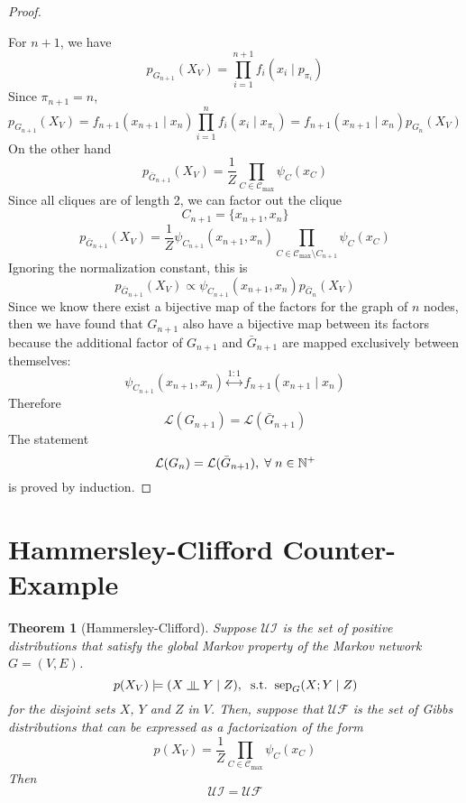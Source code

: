 \documentclass{article}
\numberwithin{equation}{section}
\newcommand{\s}{\hspace{0.1cm}}
\newcommand{\indep}{\s \rotatebox[origin=c]{90}{$\models$}\s }
\theoremstyle{named}
\newtheorem*{namedtheorem}{Theorem}
\begin{document}
\begin{proof}
\begin{enumerate}
        \end{enumerate}

        For $n + 1$, we have
        \[
                p_{G_{n + 1}}(X_V) = \prod_{i = 1}^{n+1} f_i(x_i \mid p_{\pi_i})
        \]
        Since $\pi_{n +1} = n$, 
        \[
                p_{G_{n + 1}}(X_V) = f_{n + 1}(x_{n + 1} \mid x_{n})\prod_{i = 1}^{n} 
                f_i(x_i \mid x_{\pi_i}) = f_{n + 1}(x_{n + 1} \mid x_n) p_{G_n}(X_V)
        \]
        On the other hand
        \[
                p_{\bar{G}_{n + 1}}(X_V) = \frac{1}{Z} \prod_{C \in \mathscr{C}_{\max}} 
                \psi_C (x_C)
        \]
        Since all cliques are of length 2, we can factor out the clique 
        \[
                C_{n + 1} = \{x_{n + 1}, x_n\} 
        \]
        \[
                p_{\bar{G}_{n + 1}}(X_V) = \frac{1}{Z} \psi_{C_{n + 1}}(x_{n + 1}, x_n) 
                \prod_{C \in \mathscr{C}_{\max} \setminus C_{n + 1}} \psi_C(x_C)
        \]
        Ignoring the normalization constant, this is 
        \[
                p_{\bar{G}_{n + 1}}(X_V) 
                \propto \psi_{C_{n + 1}}(x_{n + 1}, x_n) p_{\bar{G}_n}(X_V)
        \]
        Since we know there exist a bijective map of the factors for the graph of 
        $n$ nodes, then we have found that $G_{n + 1}$ also have a bijective 
        map between its factors because the additional factor of $G_{n + 1}$ 
        and $\bar{G}_{n + 1}$ are mapped exclusively between themselves:
        \[
                \psi_{C_{n + 1}}(x_{n + 1}, x_n) 
                \overset{1:1}{\longleftrightarrow} f_{n + 1}(x_{n + 1} \mid x_n)
        \]
        Therefore
        \[
                \mathcal{L}(G_{n + 1}) = \mathcal{L}(\bar{G}_{n + 1})
        \]
        The statement 
        \[
                \mathcal{L}(G_n) = \mathcal{L}(\bar{G}_{n+1}),\s \forall \s n
                \in \mathbb{N}^+
        \]
        is proved by induction.

\end{proof}



\section{Hammersley-Clifford Counter-Example}
\begin{namedtheorem}[Hammersley-Clifford]
Suppose $\mathcal{UI}$ is the set of positive distributions that satisfy the global Markov 
property of the Markov network $G = (V, E)$. 
\[
        p(X_V) \models (X \indep Y \mid Z),\s\s \text{s.t.}\s\s \text{sep}_G(X ;Y \mid Z)
\]
for the disjoint sets $X$, $Y$ and $Z$ in $V$.
Then, suppose that  
 $\mathcal{UF}$ is the set of Gibbs distributions that can be expressed as a factorization 
of the form 
\[
        p(X_V) = \frac{1}{Z} \prod_{C \in \mathscr{C}_{\max}} \psi_C(x_C)
\]
Then
\[
        \mathcal{UI} = \mathcal{UF}
\]
\end{namedtheorem}
\end{document}
